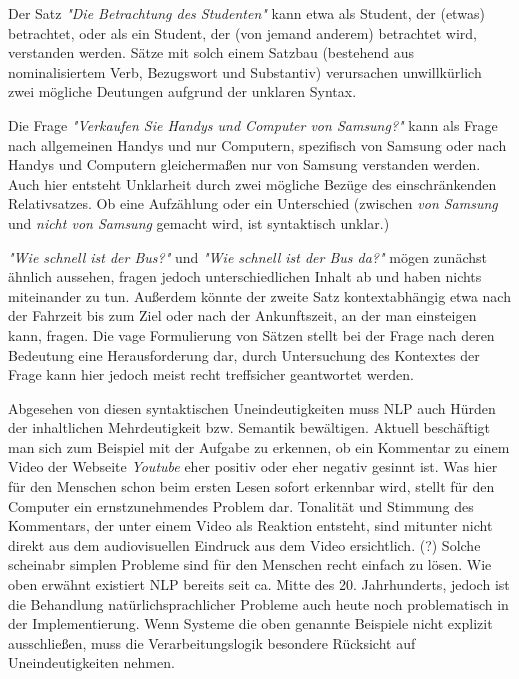 \documentclass[12pt]{report}
\begin{document}
Der Satz \textit{"Die Betrachtung des Studenten"} kann etwa als Student, der (etwas) betrachtet, oder als ein Student, der (von jemand anderem) betrachtet wird, verstanden werden. Sätze mit solch einem Satzbau (bestehend aus nominalisiertem Verb, Bezugswort und Substantiv) verursachen unwillkürlich zwei mögliche Deutungen aufgrund der unklaren Syntax.

Die Frage \textit{"Verkaufen Sie Handys und Computer von Samsung?"} kann als Frage nach allgemeinen Handys und nur Computern, spezifisch von Samsung oder nach Handys und Computern gleichermaßen nur von Samsung verstanden werden. Auch hier entsteht Unklarheit durch zwei mögliche Bezüge des einschränkenden Relativsatzes. Ob eine Aufzählung oder ein Unterschied (zwischen \textit{von Samsung} und \textit{nicht von Samsung} gemacht wird, ist syntaktisch unklar.)

\textit{"Wie schnell ist der Bus?"} und \textit{"Wie schnell ist der Bus da?"} mögen zunächst ähnlich aussehen, fragen jedoch unterschiedlichen Inhalt ab und haben nichts miteinander zu tun. Außerdem könnte der zweite Satz kontextabhängig etwa nach der Fahrzeit bis zum Ziel oder nach der Ankunftszeit, an der man einsteigen kann, fragen. Die vage Formulierung von Sätzen stellt bei der Frage nach deren Bedeutung eine Herausforderung dar, durch Untersuchung des Kontextes der Frage kann hier jedoch meist recht treffsicher geantwortet werden.

Abgesehen von diesen syntaktischen Uneindeutigkeiten muss NLP auch Hürden der inhaltlichen Mehrdeutigkeit bzw. Semantik bewältigen. Aktuell beschäftigt man sich zum Beispiel mit der Aufgabe zu erkennen, ob ein Kommentar zu einem Video der Webseite \textit{Youtube} eher positiv oder eher negativ gesinnt ist. Was hier für den Menschen schon beim ersten Lesen sofort erkennbar wird, stellt für den Computer ein ernstzunehmendes Problem dar. Tonalität und Stimmung des Kommentars, der unter einem Video als Reaktion entsteht, sind mitunter nicht direkt aus dem audiovisuellen Eindruck aus dem Video ersichtlich. (?)
Solche scheinabr simplen Probleme sind für den Menschen recht einfach zu lösen. Wie oben erwähnt existiert NLP bereits seit ca. Mitte des 20. Jahrhunderts, jedoch ist die Behandlung natürlichsprachlicher Probleme auch heute noch problematisch in der Implementierung. Wenn Systeme die oben genannte Beispiele nicht explizit ausschließen, muss die Verarbeitungslogik besondere Rücksicht auf Uneindeutigkeiten nehmen.
\end{document}
